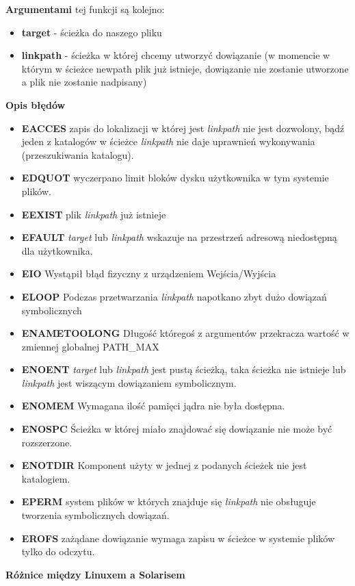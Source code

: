 \documentclass{article}
\begin{document}
\textbf{Argumentami} tej funkcji są kolejno:
\begin{itemize}
\item \textbf{target} - ścieżka do naszego pliku
\item \textbf{linkpath} - ścieżka w której chcemy utworzyć dowiązanie (w momencie w którym w ścieżce newpath plik już istnieje, dowiązanie nie zostanie utworzone a plik nie zostanie nadpisany)
\end{itemize}

\textbf{Opis błędów}
\begin{itemize}
\item \textbf{EACCES} zapis do lokalizacji w której jest \textit{linkpath} nie jest dozwolony, bądź jeden z katalogów w ścieżce \textit{linkpath} nie daje uprawnień wykonywania (przeszukiwania katalogu).
\item \textbf{EDQUOT} wyczerpano limit bloków dysku użytkownika w tym systemie plików.
\item \textbf{EEXIST} plik \textit{linkpath} już istnieje
\item \textbf{EFAULT} \textit{target} lub  \textit{linkpath} wskazuje na przestrzeń adresową niedostępną dla użytkownika.
\item \textbf{EIO} Wystąpił błąd fizyczny z urządzeniem Wejścia/Wyjścia
\item \textbf{ELOOP} Podczas przetwarzania \textit{linkpath} napotkano zbyt dużo dowiązań symbolicznych
\item \textbf{ENAMETOOLONG} Długość któregoś z argumentów 
przekracza wartość w zmiennej globalnej PATH\_MAX
\item \textbf{ENOENT}  \textit{target} lub \textit{linkpath} jest pustą ścieżką, taka ścieżka nie istnieje lub \textit{linkpath} jest wiszącym dowiązaniem symbolicznym. 
\item \textbf{ENOMEM}  Wymagana ilość pamięci jądra nie była dostępna.
\item \textbf{ENOSPC}  Ścieżka w której miało znajdować się dowiązanie nie może być rozszerzone.
\item \textbf{ENOTDIR}  Komponent użyty w jednej z podanych ścieżek nie jest katalogiem.
\item \textbf{EPERM} system plików w których znajduje się \textit{linkpath} nie obsługuje tworzenia symbolicznych dowiązań.
\item \textbf{EROFS} zażądane dowiązanie wymaga zapisu w ścieżce w systemie plików tylko do odczytu.



\end{itemize}
\textbf{Różnice między Linuxem a Solarisem}
\end{document}
